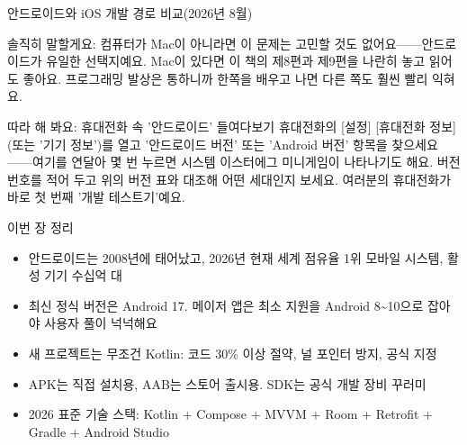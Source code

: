 \begin{center}\small\color{gray}안드로이드와 iOS 개발 경로 비교(2026년 8월)\end{center}

솔직히 말할게요: 컴퓨터가 Mac이 아니라면 이 문제는 고민할 것도 없어요——안드로이드가 유일한 선택지예요. Mac이 있다면 이 책의 제8편과 제9편을 나란히 놓고 읽어도 좋아요. 프로그래밍 발상은 통하니까 한쪽을 배우고 나면 다른 쪽도 훨씬 빨리 익혀요.

\begin{tcbpractice}{따라 해 봐요: 휴대전화 속 '안드로이드' 들여다보기}
휴대전화의 [설정] [휴대전화 정보](또는 '기기 정보')를 열고 '안드로이드 버전' 또는 'Android 버전' 항목을 찾으세요——여기를 연달아 몇 번 누르면 시스템 이스터에그 미니게임이 나타나기도 해요. 버전 번호를 적어 두고 위의 버전 표와 대조해 어떤 세대인지 보세요. 여러분의 휴대전화가 바로 첫 번째 '개발 테스트기'예요.

\end{tcbpractice}

\begin{tcbsummary}{이번 장 정리}
\begin{itemize}
  \item 안드로이드는 2008년에 태어났고, 2026년 현재 세계 점유율 1위 모바일 시스템, 활성 기기 수십억 대
  \item 최신 정식 버전은 Android 17. 메이저 앱은 최소 지원을 Android 8\textasciitilde{}10으로 잡아야 사용자 풀이 넉넉해요
  \item 새 프로젝트는 무조건 Kotlin: 코드 30\% 이상 절약, 널 포인터 방지, 공식 지정
  \item APK는 직접 설치용, AAB는 스토어 출시용. SDK는 공식 개발 장비 꾸러미
  \item 2026 표준 기술 스택: Kotlin + Compose + MVVM + Room + Retrofit + Gradle + Android Studio
\end{itemize}

\end{tcbsummary}
